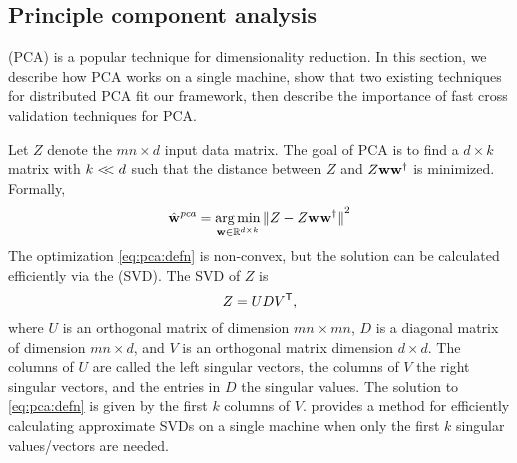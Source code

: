 \documentclass[thesis.tex]{subfiles}
\newcommand{\wpca}{\hat\w^\textit{pca}}
\begin{document}

\subsection{Principle component analysis}
\label{sec:merge:pca}

 (PCA) is a popular technique for dimensionality reduction.
In this section,
we describe how PCA works on a single machine,
show that two existing techniques for distributed PCA fit our framework,
then describe the importance of fast cross validation techniques for PCA.

Let $Z$ denote the $mn\times d$ input data matrix.
The goal of PCA is to find a $d\times k$ matrix with $k <\!\!< d$ such that the distance between $Z$ and $Z\mathbf w{\mathbf w}^{\mathsf{\dagger}}$ is minimized.
Formally, 
\begin{equation}
    \label{eq:pca:defn}
    \wpca = \argmin_{\w\in\R^{d\times k}} \ltwo{Z - Z\w\pinv\w}^2
\end{equation}
The optimization \eqref{eq:pca:defn} is non-convex, 
but the solution can be calculated efficiently via the  (SVD). 
The SVD of $Z$ is
\begin{equation}
    Z = UD{V}^{\mathsf{T}}
    ,
\end{equation}
where $U$ is an orthogonal matrix of dimension $mn\times mn$, 
$D$ is a diagonal matrix of dimension $mn\times d$, 
and $V$ is an orthogonal matrix dimension $d\times d$.
The columns of $U$ are called the left singular vectors, 
the columns of $V$ the right singular vectors,
and the entries in $D$ the singular values.
The solution to \eqref{eq:pca:defn} is given by the first $k$ columns of $V$.
\citet{halko2011finding} provides a method for efficiently calculating approximate SVDs on a single machine when only the first $k$ singular values/vectors are needed.
\end{document}
